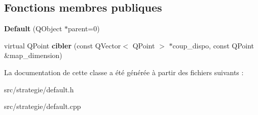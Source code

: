 \subsection*{Fonctions membres publiques}
\begin{DoxyCompactItemize}
\item 
{\bfseries Default} (Q\+Object $\ast$parent=0)\hypertarget{class_default_ab11781e9e6e6a20708c1bf65a4f6da7e}{}\label{class_default_ab11781e9e6e6a20708c1bf65a4f6da7e}

\item 
virtual Q\+Point {\bfseries cibler} (const Q\+Vector$<$ Q\+Point $>$ $\ast$coup\+\_\+dispo, const Q\+Point \&map\+\_\+dimension)\hypertarget{class_default_a84280ded22bf749d9d11d59099cd02fd}{}\label{class_default_a84280ded22bf749d9d11d59099cd02fd}

\end{DoxyCompactItemize}


La documentation de cette classe a été générée à partir des fichiers suivants \+:\begin{DoxyCompactItemize}
\item 
src/strategie/default.\+h\item 
src/strategie/default.\+cpp\end{DoxyCompactItemize}
